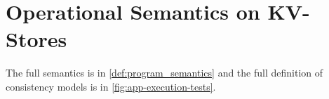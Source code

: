 \section{Operational Semantics on KV-Stores}
\label{sec:full-semantics}

The full semantics is in \cref{def:program_semantics} and the full definition of consistency models is in \cref{fig:app-execution-tests}.




